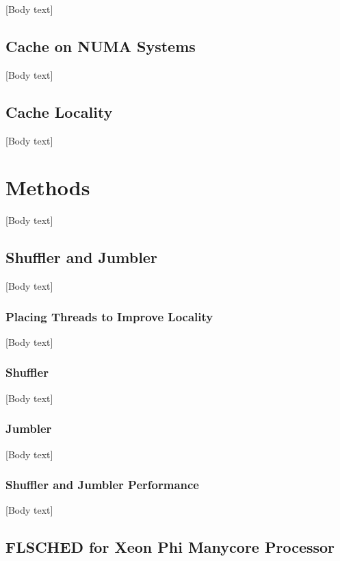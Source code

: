 \documentclass{sig-alternate}
\begin{document}
[Body text]

\subsection{Cache on NUMA Systems}
\label{sec:cache}

[Body text]

\subsection{Cache Locality}
\label{sec:cachelocality}

[Body text]

\section{Methods}
\label{sec:methods}

[Body text]

\subsection{Shuffler and Jumbler}
\label{sec:sj}

[Body text]

\subsubsection{Placing Threads to Improve Locality}
\label{sec:threadlocality}

[Body text]

\subsubsection{Shuffler}
\label{sec:shuffler}

[Body text]

\subsubsection{Jumbler}
\label{sec:jumbler}

[Body text]

\subsubsection{Shuffler and Jumbler Performance}
\label{sec:sj_performance}

[Body text]

\subsection{FLSCHED for Xeon Phi Manycore Processor}
\label{sec:flsched}
\end{document}
